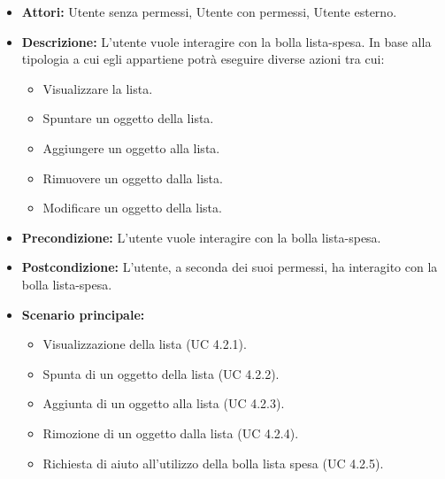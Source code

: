 \FloatBarrier
\begin{itemize}
\item \textbf{Attori:} Utente senza permessi, Utente con permessi, Utente esterno.
\item \textbf{Descrizione:} L'utente vuole interagire con la bolla lista-spesa. In base alla tipologia a cui egli appartiene potrà eseguire diverse azioni tra cui:
\begin{itemize}
\item Visualizzare la lista.
\item Spuntare un oggetto della lista.
\item Aggiungere un oggetto alla lista.
\item Rimuovere un oggetto dalla lista.
\item Modificare un oggetto della lista.
\end{itemize}
\item \textbf{Precondizione:} L'utente vuole interagire con la bolla lista-spesa. 
\item \textbf{Postcondizione:} L'utente, a seconda dei suoi permessi, ha interagito con la bolla lista-spesa.
\item \textbf{Scenario principale:}
	\begin{itemize}
	\item{Visualizzazione della lista (UC 4.2.1).}
	\item{Spunta di un oggetto della lista (UC 4.2.2).}
	\item{Aggiunta di un oggetto alla lista (UC 4.2.3).}
	\item{Rimozione di un oggetto dalla lista (UC 4.2.4).}
	\item{Richiesta di aiuto all'utilizzo della bolla lista spesa (UC 4.2.5).}
	\end{itemize}
\end{itemize}